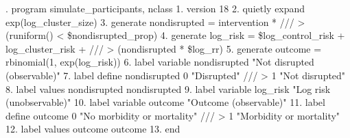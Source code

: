 . program simulate_participants, nclass
  1.   version 18
  2.   quietly expand exp(log_cluster_size)
  3.   generate nondisrupted = intervention *                               ///
>                              (runiform() < \$nondisrupted_prop)
  4.   generate log_risk     = \$log_control_risk + log_cluster_risk +       ///
>                              (nondisrupted * \$log_rr)
  5.   generate outcome      = rbinomial(1, exp(log_risk))
  6.   label variable nondisrupted "Not disrupted (observable)"
  7.   label define   nondisrupted 0 "Disrupted"                            ///
>                                  1 "Not disrupted"
  8.   label values   nondisrupted nondisrupted
  9.   label variable log_risk     "Log risk (unobservable)"
 10.   label variable outcome      "Outcome (observable)"
 11.   label define   outcome      0 "No morbidity or mortality"            ///
>                                  1 "Morbidity or mortality"
 12.   label values   outcome      outcome
 13. end
{\smallskip}
